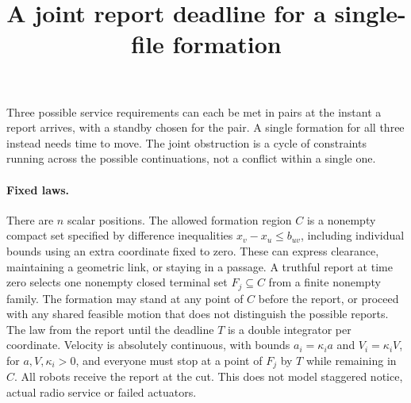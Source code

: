 \documentclass[11pt]{article}
\title{A joint report deadline for a single-file formation}
\begin{document}
\maketitle

Three possible service requirements can each be met in pairs at the
instant a report arrives, with a standby chosen for the pair.
A single formation for all three instead needs time to move. The
joint obstruction is a cycle of constraints running across the
possible continuations, not a conflict within a single one.

\paragraph{Fixed laws.}
There are \(n\) scalar positions. The allowed formation region \(C\)
is a nonempty compact set specified by difference inequalities
\(x_v-x_u\le b_{uv}\), including individual bounds using an extra
coordinate fixed to zero. These can express clearance, maintaining
a geometric link, or staying in a passage. A truthful report at time
zero selects one nonempty closed terminal set \(F_j\subseteq C\) from
a finite nonempty family. The formation may stand at any point of
\(C\) before the report, or proceed with any shared feasible motion
that does not distinguish the possible reports. The law from the
report until the deadline \(T\) is a double integrator per coordinate.
Velocity is absolutely continuous, with bounds \(a_i=\kappa_i a\)
and \(V_i=\kappa_i V\), for \(a,V,\kappa_i>0\), and everyone must
stop at a point of \(F_j\) by \(T\) while remaining in \(C\). All
robots receive the report at the cut. This does not model staggered
notice, actual radio service or failed actuators.
\end{document}
